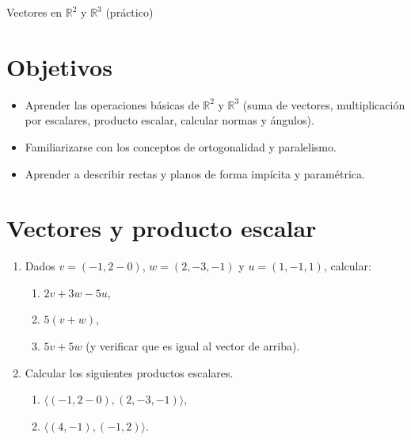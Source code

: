 \begin{chapter}{Vectores en $\mathbb R^2$ y $\mathbb R^3$ (práctico)}\label{practico-1}


\section*{Objetivos}

\begin{itemize}
 \item Aprender las operaciones básicas de $\mathbb R^2$ y $\mathbb R^3$ (suma de vectores, multiplicación por escalares, producto escalar, calcular normas y \'angulos).
 \item Familiarizarse con los conceptos de ortogonalidad y paralelismo.
 \item Aprender a describir rectas y planos de forma imp\'icita y param\'etrica.
\end{itemize}



\section*{Vectores y producto escalar}

\begin{enumerate}


\item Dados $v = (-1, 2-0)$, $w = (2,-3,-1)$ y $u = (1,-1,1)$, calcular:
\begin{enumerate}
	\item $2v + 3w -5u$,
	\item $5(v+w)$, 
	\item $5v + 5w$ (y verificar que es igual al vector de arriba).
\end{enumerate}


\item Calcular los siguientes productos escalares. %
\begin{enumerate}
  \item $\langle (-1, 2-0) ,(2,-3,-1) \rangle$, 
  \item  $\langle (4,-1),(-1,2) \rangle$.
\end{enumerate}



\end{enumerate}
\end{chapter}
